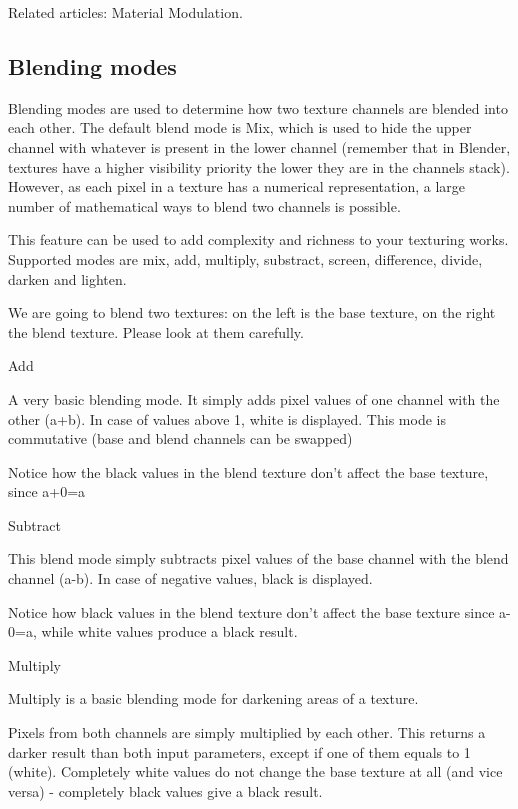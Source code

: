Related articles: Material Modulation.

\subsection{Blending modes}

Blending modes are used to determine how two texture channels are blended into each other. The default blend mode is Mix, which is used to hide the upper channel with whatever is present in the lower channel (remember that in Blender, textures have a higher visibility priority the lower they are in the channels stack). However, as each pixel in a texture has a numerical representation, a large number of mathematical ways to blend two channels is possible.

This feature can be used to add complexity and richness to your texturing works. Supported modes are mix, add, multiply, substract, screen, difference, divide, darken and lighten.


We are going to blend two textures: on the left is the base texture, on the right the blend texture. Please look at them carefully.


   

Add

A very basic blending mode. It simply adds pixel values of one channel with the other (a+b). In case of values above 1, white is displayed. This mode is commutative (base and blend channels can be swapped)

Notice how the black values in the blend texture don't affect the base texture, since a+0=a

Subtract

This blend mode simply subtracts pixel values of the base channel with the blend channel (a-b). In case of negative values, black is displayed.

Notice how black values in the blend texture don't affect the base texture since a-0=a, while white values produce a black result.

Multiply

Multiply is a basic blending mode for darkening areas of a texture.

Pixels from both channels are simply multiplied by each other. This returns a darker result than both input parameters, except if one of them equals to 1 (white). Completely white values do not change the base texture at all (and vice versa) - completely black values give a black result.

